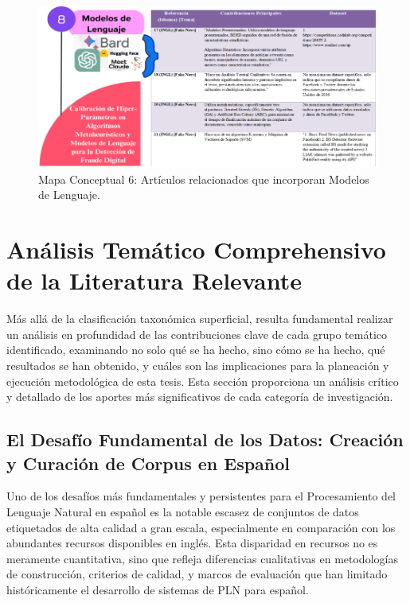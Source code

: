 \begin{figure}[h!]
    \centering
    \includegraphics[width=\textwidth]{Imagenes/mapaConceptual6.png}
    \caption{Mapa Conceptual 6: Artículos relacionados que incorporan Modelos de Lenguaje.}
    \label{fig:mapa_conceptual_6}
\end{figure}

\section{Análisis Temático Comprehensivo de la Literatura Relevante}
\label{sec:analisis_tematico}

Más allá de la clasificación taxonómica superficial, resulta fundamental realizar un análisis en profundidad de las contribuciones clave de cada grupo temático identificado, examinando no solo qué se ha hecho, sino cómo se ha hecho, qué resultados se han obtenido, y cuáles son las implicaciones para la planeación y ejecución metodológica de esta tesis. Esta sección proporciona un análisis crítico y detallado de los aportes más significativos de cada categoría de investigación.

\subsection{El Desafío Fundamental de los Datos: Creación y Curación de Corpus en Español}

Uno de los desafíos más fundamentales y persistentes para el Procesamiento del Lenguaje Natural en español es la notable escasez de conjuntos de datos etiquetados de alta calidad a gran escala, especialmente en comparación con los abundantes recursos disponibles en inglés. Esta disparidad en recursos no es meramente cuantitativa, sino que refleja diferencias cualitativas en metodologías de construcción, criterios de calidad, y marcos de evaluación que han limitado históricamente el desarrollo de sistemas de PLN para español.

